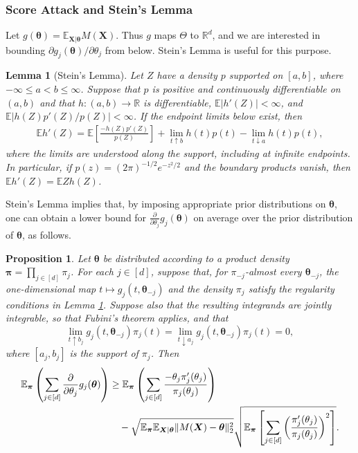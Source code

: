 \documentclass[letterpaper,12pt]{article}
\numberwithin{equation}{section}
\theoremstyle{plain}
\numberwithin{Theorem}{section}
\newtheorem{proposition}{Proposition}
\numberwithin{proposition}{section}
\newtheorem{Lemma}{Lemma}
\numberwithin{Lemma}{section}
{
	\theoremstyle{definition}
	\newtheorem{Definition}{Definition}
	\newtheorem{example}{Example}
	\numberwithin{example}{section}
	\newtheorem{fact}{Fact}
	\numberwithin{fact}{section}
	\newtheorem{remark}{Remark}
}
\newcommand{\rev}[1]{#1}
\newcommand{\1}{\mathbbm{1}}
\def\bth{{\boldsymbol{\theta}}}
\def\R{{\mathbb R}}
\def\E{\mathbb{E}}
\begin{document}
\subsubsection{Score Attack and Stein's Lemma}\label{sec: attack lower bound general}
Let $g(\bth)=\E_{\bm X|\bth}M(\bm X)$. Thus $g$ maps $\Theta$ to $\R^d$, and we are interested in bounding $\partial g_j(\bth)/\partial\theta_j$ from below. Stein's Lemma \cite{stein1972bound, stein2004use} is useful for this purpose.

\begin{Lemma}[Stein's Lemma]\label{lm: stein's lemma}
		Let $Z$ have a density $p$ supported on $[a,b]$, where $-\infty\leq a<b\leq\infty$. Suppose that $p$ is positive and continuously differentiable on $(a,b)$ and that $h:(a,b)\to\R$ is differentiable, $\E|h'(Z)|<\infty$, and \rev{$\E |h(Z)p'(Z)/p(Z)| < \infty$}. If the endpoint limits below exist, then
	\begin{align}\label{eq: stein's lemma}
			\E h'(Z) = \E\left[\frac{-h(Z)p'(Z)}{p(Z)}\right]
			+\lim_{t\uparrow b}h(t)p(t)-\lim_{t\downarrow a}h(t)p(t),
	\end{align}
		where the limits are understood along the support, including at infinite endpoints. In particular, if $p(z) = (2\pi)^{-1/2}e^{-z^2/2}$ and the boundary products vanish, then $\E h'(Z) = \E Z h(Z)$.
\end{Lemma}
Stein's Lemma implies that, by imposing appropriate prior distributions on $\bth$, one can obtain a lower bound for $\frac{\partial}{\partial\theta_j} g_j(\bth)$ on average over the prior distribution of $\bth$, as follows.
\begin{proposition}\label{prop: score attack stein's lemma}
		Let $\bth$ be distributed according to a product density $\bm \pi=\prod_{j\in[d]}\pi_j$. \rev{For each $j\in[d]$, suppose that, for $\pi_{-j}$-almost every $\bth_{-j}$, the one-dimensional map $t\mapsto g_j(t,\bth_{-j})$ and the density $\pi_j$ satisfy the regularity conditions in Lemma \ref{lm: stein's lemma}. Suppose also that the resulting integrands are jointly integrable, so that Fubini's theorem applies, and that
		\[
		\lim_{t\uparrow b_j}g_j(t,\bth_{-j})\pi_j(t)
		=\lim_{t\downarrow a_j}g_j(t,\bth_{-j})\pi_j(t)=0,
		\]
		where $[a_j,b_j]$ is the support of $\pi_j$.} Then
	\begin{align}\label{eq: score attack stein's lemma}
		\E_{\bm \pi} \left(\sum_{j \in [d]} \frac{\partial}{\partial \theta_j} g_j(\bth)\right)
		&\geq \E_{\bm \pi} \left(\sum_{j \in [d]} \frac{-\theta_j \pi'_j(\theta_j)}{\pi_j(\theta_j)}\right) \notag\\
		&\quad - \sqrt{\E_{\bm \pi}\E_{\bm X|\bth}\|M(\bm X) - \bth\|_2^2}
		\sqrt{\E_{\bm \pi} \left[\sum_{j \in [d]}\left(\frac{\pi'_j(\theta_j)}{\pi_j(\theta_j)}\right)^2\right]}.
	\end{align}
\end{proposition}
\end{document}
